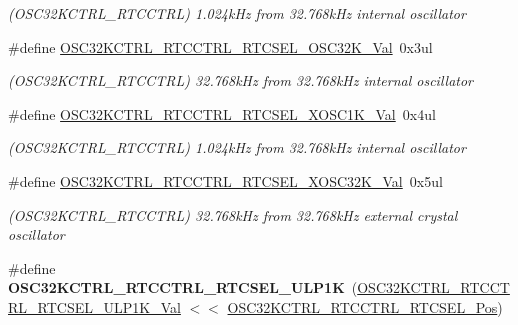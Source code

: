 \begin{DoxyCompactItemize}
\begin{DoxyCompactList}\small\item\em (O\+S\+C32\+K\+C\+T\+R\+L\+\_\+\+R\+T\+C\+C\+T\+R\+L) 1.\+024k\+Hz from 32.\+768k\+Hz internal oscillator \end{DoxyCompactList}\item 
\hypertarget{group___s_a_m_l21___o_s_c32_k_c_t_r_l_ga257ca348d5901c8e4f56bc82a3d4e3db}{}\#define \hyperlink{group___s_a_m_l21___o_s_c32_k_c_t_r_l_ga257ca348d5901c8e4f56bc82a3d4e3db}{O\+S\+C32\+K\+C\+T\+R\+L\+\_\+\+R\+T\+C\+C\+T\+R\+L\+\_\+\+R\+T\+C\+S\+E\+L\+\_\+\+O\+S\+C32\+K\+\_\+\+Val}~0x3ul\label{group___s_a_m_l21___o_s_c32_k_c_t_r_l_ga257ca348d5901c8e4f56bc82a3d4e3db}

\begin{DoxyCompactList}\small\item\em (O\+S\+C32\+K\+C\+T\+R\+L\+\_\+\+R\+T\+C\+C\+T\+R\+L) 32.\+768k\+Hz from 32.\+768k\+Hz internal oscillator \end{DoxyCompactList}\item 
\hypertarget{group___s_a_m_l21___o_s_c32_k_c_t_r_l_ga14454b0efb7d20c1a14a46ebc86ff167}{}\#define \hyperlink{group___s_a_m_l21___o_s_c32_k_c_t_r_l_ga14454b0efb7d20c1a14a46ebc86ff167}{O\+S\+C32\+K\+C\+T\+R\+L\+\_\+\+R\+T\+C\+C\+T\+R\+L\+\_\+\+R\+T\+C\+S\+E\+L\+\_\+\+X\+O\+S\+C1\+K\+\_\+\+Val}~0x4ul\label{group___s_a_m_l21___o_s_c32_k_c_t_r_l_ga14454b0efb7d20c1a14a46ebc86ff167}

\begin{DoxyCompactList}\small\item\em (O\+S\+C32\+K\+C\+T\+R\+L\+\_\+\+R\+T\+C\+C\+T\+R\+L) 1.\+024k\+Hz from 32.\+768k\+Hz internal oscillator \end{DoxyCompactList}\item 
\hypertarget{group___s_a_m_l21___o_s_c32_k_c_t_r_l_ga3a4fae30686693a728ec790fa0bde8e6}{}\#define \hyperlink{group___s_a_m_l21___o_s_c32_k_c_t_r_l_ga3a4fae30686693a728ec790fa0bde8e6}{O\+S\+C32\+K\+C\+T\+R\+L\+\_\+\+R\+T\+C\+C\+T\+R\+L\+\_\+\+R\+T\+C\+S\+E\+L\+\_\+\+X\+O\+S\+C32\+K\+\_\+\+Val}~0x5ul\label{group___s_a_m_l21___o_s_c32_k_c_t_r_l_ga3a4fae30686693a728ec790fa0bde8e6}

\begin{DoxyCompactList}\small\item\em (O\+S\+C32\+K\+C\+T\+R\+L\+\_\+\+R\+T\+C\+C\+T\+R\+L) 32.\+768k\+Hz from 32.\+768k\+Hz external crystal oscillator \end{DoxyCompactList}\item 
\hypertarget{group___s_a_m_l21___o_s_c32_k_c_t_r_l_gafafab9c8c609b5fed9d2e316ac79fbd2}{}\#define {\bfseries O\+S\+C32\+K\+C\+T\+R\+L\+\_\+\+R\+T\+C\+C\+T\+R\+L\+\_\+\+R\+T\+C\+S\+E\+L\+\_\+\+U\+L\+P1\+K}~(\hyperlink{group___s_a_m_l21___o_s_c32_k_c_t_r_l_gabc6a6db1dfeac26e74f33b4afd4a1252}{O\+S\+C32\+K\+C\+T\+R\+L\+\_\+\+R\+T\+C\+C\+T\+R\+L\+\_\+\+R\+T\+C\+S\+E\+L\+\_\+\+U\+L\+P1\+K\+\_\+\+Val} $<$$<$ \hyperlink{group___s_a_m_l21___o_s_c32_k_c_t_r_l_gadcfbd528df699f49aa94aed33cfa1324}{O\+S\+C32\+K\+C\+T\+R\+L\+\_\+\+R\+T\+C\+C\+T\+R\+L\+\_\+\+R\+T\+C\+S\+E\+L\+\_\+\+Pos})\label{group___s_a_m_l21___o_s_c32_k_c_t_r_l_gafafab9c8c609b5fed9d2e316ac79fbd2}


\end{DoxyCompactItemize}
